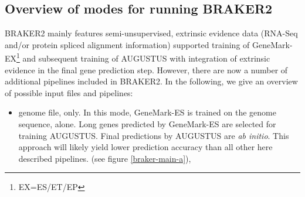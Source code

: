 \documentclass[]{article}
\begin{document}
\subsection{Overview of modes for running BRAKER2}\label{overview-of-modes-for-running-braker2}

BRAKER2 mainly features semi-unsupervised, extrinsic evidence data
(RNA-Seq and/or protein spliced alignment information) supported
training of GeneMark-EX\footnote{EX=ES/ET/EP} and subsequent training of
AUGUSTUS with integration of extrinsic evidence in the final gene
prediction step. However, there are now a number of additional pipelines
included in BRAKER2. In the following, we give an overview of possible
input files and pipelines:

\begin{itemize}
\item
  genome file, only. In this mode, GeneMark-ES is trained on the genome
  sequence, alone. Long genes predicted by GeneMark-ES are selected for
  training AUGUSTUS. Final predictions by AUGUSTUS are \emph{ab initio}.
  This approach will likely yield lower prediction accuracy than all
  other here described pipelines. (see figure \ref{braker-main-a}),


\end{itemize}
\end{document}
